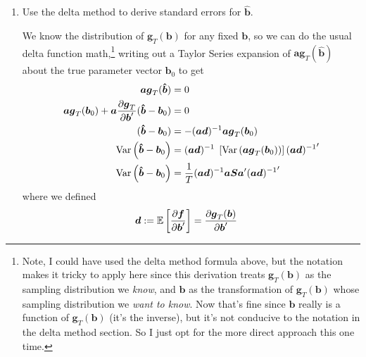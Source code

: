 \documentclass[12pt]{article}
\theoremstyle{plain}
\theoremstyle{definition}
\theoremstyle{remark}
\begin{document}
\begin{enumerate}
  \item Use the delta method to derive standard errors for
    $\boldsymbol{\hat{b}}$.

    We know the distribution of $\boldsymbol{g}_T(\boldsymbol{b})$
    for any fixed $\boldsymbol{b}$,
    so we can do the usual delta function math,\footnote{%
    Note, I could have used the delta method formula above, but the
    notation makes it
    tricky to apply here since this derivation treats
    $\boldsymbol{g}_T(\boldsymbol{b})$ as the sampling distribution we
    \emph{know}, and $\boldsymbol{b}$ as the transformation of
    $\boldsymbol{g}_T(\boldsymbol{b})$ whose sampling distribution we
    \emph{want to know}.  Now that's fine since $\boldsymbol{b}$ really
    is a function of $\boldsymbol{g}_T(\boldsymbol{b})$ (it's the
    inverse), but it's not conducive to the notation in the delta method
    section. So I just opt for the more direct approach this one time.%
    }
    writing out a Taylor Series expansion of $\boldsymbol{a}
    \boldsymbol{g}_T(\boldsymbol{\hat{b}})$ about the true parameter
    vector $\boldsymbol{b}_0$ to get
    \begin{align}
      \boldsymbol{a} \boldsymbol{g}_T(\boldsymbol{\hat{b}})
      &= 0\notag\\
      \boldsymbol{a} \boldsymbol{g}_T(\boldsymbol{b}_0)
      + \boldsymbol{a}
      \frac{\partial \boldsymbol{g}_T}{\partial \boldsymbol{b}'}
      (\boldsymbol{\hat{b}}-\boldsymbol{b}_0)
      &= 0\notag\\
      (\boldsymbol{\hat{b}}-\boldsymbol{b}_0)
      &=
      -(\boldsymbol{a} \boldsymbol{d})^{-1}
      \boldsymbol{a} \boldsymbol{g}_T(\boldsymbol{b}_0)
      \label{eq:bhat_b0}\\
      \text{Var}\left(\boldsymbol{\hat{b}}-\boldsymbol{b}_0\right)
      &=
      (\boldsymbol{a} \boldsymbol{d})^{-1}
      \; \left[\text{Var}\left(
        \boldsymbol{a} \boldsymbol{g}_T(\boldsymbol{b}_0)
      \right)
      \right]
      {(\boldsymbol{a} \boldsymbol{d})^{-1}}'\notag\\
      \text{Var}\left(\boldsymbol{\hat{b}}-\boldsymbol{b}_0\right)
      &=
      \frac{1}{T}
      (\boldsymbol{a} \boldsymbol{d})^{-1}
      \boldsymbol{a} \boldsymbol{S} \boldsymbol{a}'
      {(\boldsymbol{a} \boldsymbol{d})^{-1}}'\notag
    \end{align}
    where we defined
    \begin{align*}
      \boldsymbol{d} &:=
      \mathbb{E}\left[
        \frac{\partial \boldsymbol{f}}{\partial \boldsymbol{b}'}
      \right]
      =
      \frac{\partial \boldsymbol{g}_T(\boldsymbol{b})}{%
        \partial \boldsymbol{b}'}
    \end{align*}


\end{enumerate}
\end{document}
